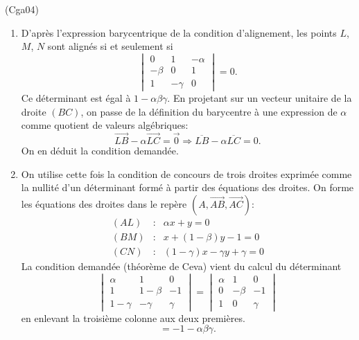 \begin{tiny}(Cga04)\end{tiny}
\begin{enumerate}
  \item D'après l'expression barycentrique de la condition d'alignement, les points $L$, $M$, $N$ sont alignés si et seulement si
\begin{displaymath}
  \begin{vmatrix}
    0      & 1       & -\alpha \\
    -\beta & 0       & 1       \\
    1      & -\gamma & 0
  \end{vmatrix}
=0.
\end{displaymath}
Ce déterminant est égal à $1 - \alpha \beta \gamma$.\newline
En projetant sur un vecteur unitaire de la droite $(BC)$, on passe de la définition du barycentre à une expression de $\alpha$ comme quotient de valeurs algébriques:
\begin{displaymath}
  \overrightarrow{LB} - \alpha \overrightarrow{LC}= \overrightarrow{0}
  \Rightarrow
  \overline{LB} - \alpha \overline{LC}= 0.
\end{displaymath}
On en déduit la condition demandée.

  \item On utilise cette fois la condition de concours de trois droites exprimée comme la nullité d'un déterminant formé à partir des équations des droites. On forme les équations des droites dans le repère $(A,\overrightarrow{AB},\overrightarrow{AC})$:
\begin{align*}
  (AL) &:& \alpha x + y = 0 \\
  (BM) &:& x + (1-\beta)y - 1 = 0 \\
  (CN) &:& (1-\gamma)x - \gamma y + \gamma = 0
\end{align*}
La condition demandée (théorème de Ceva) vient du calcul du déterminant
\begin{displaymath}
  \begin{vmatrix}
    \alpha   & 1       & 0 \\
    1        & 1-\beta & -1 \\
    1-\gamma & -\gamma & \gamma 
  \end{vmatrix}
  =
  \begin{vmatrix}
    \alpha   & 1       & 0 \\
    0        & -\beta & -1 \\
    1        & 0      & \gamma 
  \end{vmatrix}
\end{displaymath}
en enlevant la troisième colonne aux deux premières.
\begin{displaymath}
  = - 1 - \alpha \beta \gamma.
\end{displaymath}


\end{enumerate}

